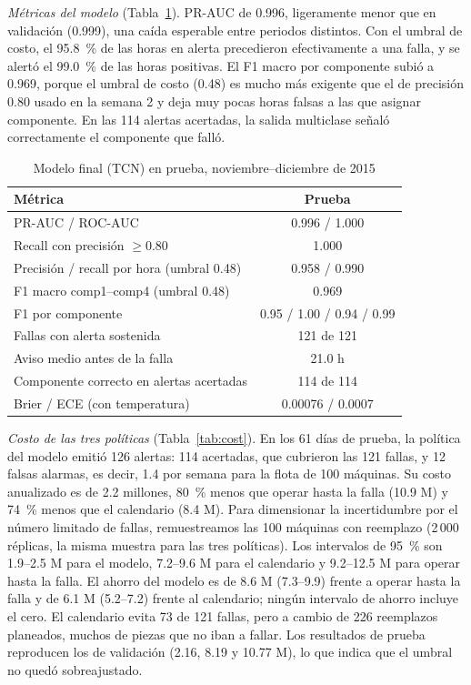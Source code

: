 \documentclass[conference,letterpaper]{IEEEtran}
\begin{document}
\textit{Métricas del modelo} (Tabla~\ref{tab:test}). PR-AUC de 0.996, ligeramente menor que en validación (0.999), una caída esperable entre periodos distintos. Con el umbral de costo, el 95.8~\% de las horas en alerta precedieron efectivamente a una falla, y se alertó el 99.0~\% de las horas positivas. El F1 macro por componente subió a 0.969, porque el umbral de costo (0.48) es mucho más exigente que el de precisión 0.80 usado en la semana 2 y deja muy pocas horas falsas a las que asignar componente. En las 114 alertas acertadas, la salida multiclase señaló correctamente el componente que falló.

\begin{table}[t]
\centering
\caption{Modelo final (TCN) en prueba, noviembre--diciembre de 2015}
\label{tab:test}
\begin{tabular}{lc}
\toprule
Métrica & Prueba \\
\midrule
PR-AUC / ROC-AUC & 0.996 / 1.000 \\
Recall con precisión $\ge 0.80$ & 1.000 \\
Precisión / recall por hora (umbral 0.48) & 0.958 / 0.990 \\
F1 macro comp1--comp4 (umbral 0.48) & 0.969 \\
F1 por componente & 0.95 / 1.00 / 0.94 / 0.99 \\
Fallas con alerta sostenida & 121 de 121 \\
Aviso medio antes de la falla & 21.0 h \\
Componente correcto en alertas acertadas & 114 de 114 \\
Brier / ECE (con temperatura) & 0.00076 / 0.0007 \\
\bottomrule
\end{tabular}
\end{table}

\textit{Costo de las tres políticas} (Tabla~\ref{tab:cost}). En los 61 días de prueba, la política del modelo emitió 126 alertas: 114 acertadas, que cubrieron las 121 fallas, y 12 falsas alarmas, es decir, 1.4 por semana para la flota de 100 máquinas. Su costo anualizado es de 2.2 millones, 80~\% menos que operar hasta la falla (10.9 M) y 74~\% menos que el calendario (8.4 M). Para dimensionar la incertidumbre por el número limitado de fallas, remuestreamos las 100 máquinas con reemplazo (2\,000 réplicas, la misma muestra para las tres políticas). Los intervalos de 95~\% son 1.9--2.5 M para el modelo, 7.2--9.6 M para el calendario y 9.2--12.5 M para operar hasta la falla. El ahorro del modelo es de 8.6 M (7.3--9.9) frente a operar hasta la falla y de 6.1 M (5.2--7.2) frente al calendario; ningún intervalo de ahorro incluye el cero. El calendario evita 73 de 121 fallas, pero a cambio de 226 reemplazos planeados, muchos de piezas que no iban a fallar. Los resultados de prueba reproducen los de validación (2.16, 8.19 y 10.77 M), lo que indica que el umbral no quedó sobreajustado.
\end{document}
